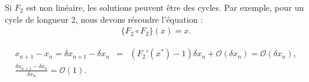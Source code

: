 \begin{enumerate}[label = Méthode \arabic*)]
	Si \(F_2\) est non linéaire, les solutions peuvent être des cycles. Par exemple, pour un cycle de longueur 2, nous devons résoudre l'équation :
	\begin{eqnarray}
		\{F_2 \circ F_2\}(x) = x.
	\end{eqnarray}
	
	\begin{eqnarray}
		x_{n+1} - x_{n} = \delta x_{n+1} - \delta x_{n} & = &  (F_2'(x^\ast) - 1 )\delta x_n + \mathcal{O}(\delta x_n) = \mathcal{O}(\delta x_n), \\
		\frac{\delta x_{n+1} - \delta x_{n}}{\delta x_{n}} = \mathcal{O}(1).
	\end{eqnarray}

	

\end{enumerate}




	
	
	
	





 


	

 






	



	
	

